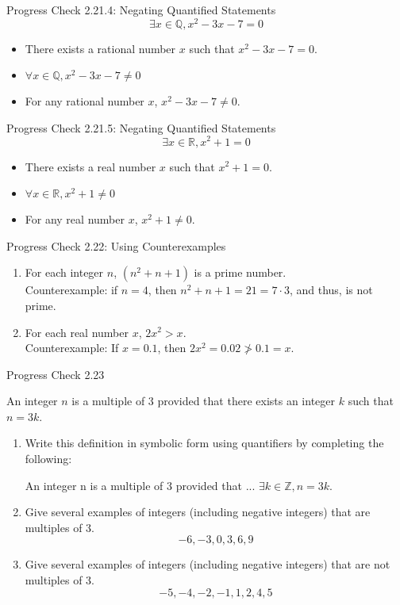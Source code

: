 \documentclass{beamer}
\begin{document}
\begin{frame}{Progress Check 2.21.4: Negating Quantified Statements}
	\[\exists x \in \mathbb{Q}, x^2 - 3x - 7 = 0\]
	\pause
	\begin{itemize}
		\item There exists a rational number $x$ such that $x^2 - 3x - 7 = 0$.\pause
		\item \(\forall x \in \mathbb{Q}, x^2 - 3x - 7 \neq 0\) \pause
		\item For any rational number $x$, $x^2 - 3x - 7 \neq 0$.
	\end{itemize}
\end{frame}

\begin{frame}{Progress Check 2.21.5: Negating Quantified Statements}
	\[\exists x \in \mathbb{R}, x^2 + 1 = 0\]
	\pause
	\begin{itemize}
		\item There exists a real number $x$ such that $x^2 +1 = 0$.\pause
		\item \(\forall x \in \mathbb{R}, x^2 +1 \neq 0\) \pause
		\item For any real number $x$, $x^2 +1 \neq 0$.
	\end{itemize}
\end{frame}

\begin{frame}{Progress Check 2.22: Using Counterexamples}
	\begin{enumerate}
		\item For each integer $n$, $(n^2 + n + 1)$ is a prime number.\\[.1 in] \pause
		Counterexample: if $n = 4$, then $n^2 + n + 1 = 21 = 7 \cdot 3$, and thus, is not prime. \pause
		\item For each real number $x$, $2x^2 > x$.\\[.1 in]\pause
		Counterexample: If $x = 0.1$, then $2x^2 = 0.02 \not > 0.1 = x$.
	\end{enumerate}
\end{frame}

\begin{frame}{Progress Check 2.23}
	\begin{definition}
		An integer $n$ is a multiple of 3 provided that there exists an integer
		$k$ such that $n = 3k$.
	\end{definition}
	\pause
	\begin{enumerate}
		\item Write this definition in symbolic form using quantifiers by completing the following:
		\begin{center}
			An integer n is a multiple of 3 provided that ... \pause $\exists k \in \mathbb{Z}, n = 3k$.
		\end{center}
		\pause
		\item Give several examples of integers (including negative integers) that are multiples of 3.\pause
		\[-6,-3,0,3,6,9\]
		\pause
		\item Give several examples of integers (including negative integers) that are not multiples of 3.\pause
		\[-5,-4,-2,-1,1,2,4,5\]
	\end{enumerate}
\end{frame}
\end{document}
